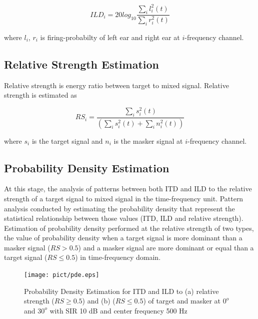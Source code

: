 \documentclass[a4paper]{jpconf}
\begin{document}
\begin{equation}\label{pers:ild}
ILD_i = 20log_{10}\frac{\sum_i l_i^2(t)}{\sum_i r_i^2(t)}
\end{equation}

where $l_i$, $r_i$ is firing-probabilty of left ear and right ear at $i$-frequency channel.

\subsection{Relative Strength Estimation}
Relative strength is energy ratio between target to mixed signal. Relative strength is estimated as

\begin{equation}
RS_i = \frac{\sum_i s_i^2(t)}{\left(\sum_i s_i^2(t) + \sum_i n_i^2(t)\right)}
\end{equation}

where $s_i$ is the target signal and $n_i$ is the masker signal at $i$-frequency channel.

\subsection{Probability Density Estimation}
At this stage, the analysis of patterns between both ITD and ILD to the relative strength of a target signal to mixed signal in the time-frequency unit. Pattern analysis conducted by estimating the probability density that represent the statistical relationship between those values (ITD, ILD and relative strength). Estimation of probability density performed at the relative strength of two types, the value of probability density when a target signal is more dominant than a masker signal ($RS > 0.5$) and a masker signal are more dominant or equal than a target signal ($RS \leq 0.5$) in time-frequency domain.


\begin{figure}[h]
    \centering
    \texttt{[image: pict/pde.eps]}
    \caption{\label{pict:pde}Probability Density Estimation for ITD and ILD to (a) relative strength ($RS \ge 0.5$) and (b) ($RS \leq 0.5$) of target and masker at $0^o$ and $30^o$ with SIR 10 dB and center frequency 500 Hz}
\end{figure} 
\end{document}
